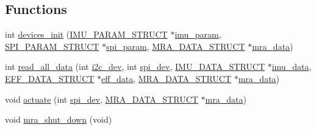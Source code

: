 \subsection*{Functions}
\begin{DoxyCompactItemize}
\item 
int \hyperlink{communication_01_07C_xC3_xB3pia_01em_01conflito_01de_01Caio_01Gustavo_01Mesquita_01Angelo_012013-05-17_08_8h_a2d1e523ff70db11ca4096f97af5da000}{devices\-\_\-init} (\hyperlink{structIMU__PARAM__STRUCT}{I\-M\-U\-\_\-\-P\-A\-R\-A\-M\-\_\-\-S\-T\-R\-U\-C\-T} $\ast$\hyperlink{main2_8c_a9c6b2109fb9402446f92995db60951b5}{imu\-\_\-param}, \hyperlink{structSPI__PARAM__STRUCT}{S\-P\-I\-\_\-\-P\-A\-R\-A\-M\-\_\-\-S\-T\-R\-U\-C\-T} $\ast$\hyperlink{main2_8c_adec2468b88cf50b20e5cf399a3b7e994}{spi\-\_\-param}, \hyperlink{structMRA__DATA__STRUCT}{M\-R\-A\-\_\-\-D\-A\-T\-A\-\_\-\-S\-T\-R\-U\-C\-T} $\ast$\hyperlink{main2_8c_abc42e18d2909e9bc119316283f4ed9db}{mra\-\_\-data})
\item 
int \hyperlink{communication_01_07C_xC3_xB3pia_01em_01conflito_01de_01Caio_01Gustavo_01Mesquita_01Angelo_012013-05-17_08_8h_a5f0316a5f70c7e369541e996802603b4}{read\-\_\-all\-\_\-data} (int \hyperlink{CommunicationV0_2communication_8c_a7751bd45ac1064efb35adf1f19c25db8}{i2c\-\_\-dev}, int \hyperlink{CommunicationV0_2communication_8c_a4788f0a5355494bc6c13690e28f43783}{spi\-\_\-dev}, \hyperlink{structIMU__DATA__STRUCT}{I\-M\-U\-\_\-\-D\-A\-T\-A\-\_\-\-S\-T\-R\-U\-C\-T} $\ast$\hyperlink{threads__linux_8c_a3cfea12cbe9ca7f1681c950e4cd68606}{imu\-\_\-data}, \hyperlink{structEFF__DATA__STRUCT}{E\-F\-F\-\_\-\-D\-A\-T\-A\-\_\-\-S\-T\-R\-U\-C\-T} $\ast$\hyperlink{main2_8c_a5650ece8c3a277c7f158d75ae65265fa}{eff\-\_\-data}, \hyperlink{structMRA__DATA__STRUCT}{M\-R\-A\-\_\-\-D\-A\-T\-A\-\_\-\-S\-T\-R\-U\-C\-T} $\ast$\hyperlink{main2_8c_abc42e18d2909e9bc119316283f4ed9db}{mra\-\_\-data})
\item 
void \hyperlink{communication_01_07C_xC3_xB3pia_01em_01conflito_01de_01Caio_01Gustavo_01Mesquita_01Angelo_012013-05-17_08_8h_a1d5f01d0124cff7030b5c4951b4bbefa}{actuate} (int \hyperlink{CommunicationV0_2communication_8c_a4788f0a5355494bc6c13690e28f43783}{spi\-\_\-dev}, \hyperlink{structMRA__DATA__STRUCT}{M\-R\-A\-\_\-\-D\-A\-T\-A\-\_\-\-S\-T\-R\-U\-C\-T} $\ast$\hyperlink{main2_8c_abc42e18d2909e9bc119316283f4ed9db}{mra\-\_\-data})
\item 
void \hyperlink{communication_01_07C_xC3_xB3pia_01em_01conflito_01de_01Caio_01Gustavo_01Mesquita_01Angelo_012013-05-17_08_8h_a8da2a9706cfdbe1a7fae96aac9e4f516}{mra\-\_\-shut\-\_\-down} (void)
\end{DoxyCompactItemize}


